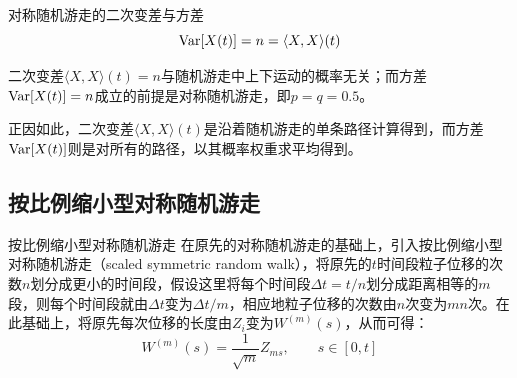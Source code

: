 \documentclass[t]{beamer}
\newcommand{\Var}{{\rm Var}}
\begin{document}
\begin{frame}{对称随机游走的二次变差与方差}
  \begin{equation*}
    \Var[X(t)]=n=\langle X,X\rangle(t)
    \end{equation*}

    二次变差$\langle X,X\rangle(t)=n$与随机游走中上下运动的概率无关；而方差$\Var[X(t)]=n$成立的前提是对称随机游走，即$p=q=0.5$。
    
    正因如此，二次变差$\langle X,X\rangle(t)$是沿着随机游走的单条路径计算得到，而方差$\Var[X(t)]$则是对所有的路径，以其概率权重求平均得到。
\end{frame}

\subsection{按比例缩小型对称随机游走}
\begin{frame}{按比例缩小型对称随机游走}
  在原先的对称随机游走的基础上，引入按比例缩小型对称随机游走（scaled symmetric random walk），将原先的$t$时间段粒子位移的次数$n$划分成更小的时间段，假设这里将每个时间段$\Delta t=t/n$划分成距离相等的$m$段，则每个时间段就由$\Delta t$变为$\Delta t/m$，相应地粒子位移的次数由$n$次变为$mn$次。在此基础上，将原先每次位移的长度由$Z_i$变为$W^{(m)}(s)$，从而可得：
  \begin{equation*}
  W^{(m)}(s)=\frac{1}{\sqrt{m}}Z_{ms},\qquad s\in[0,t]
  \end{equation*}
\end{frame}
\end{document}
